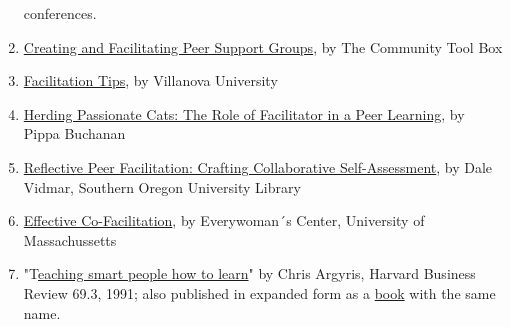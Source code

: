 \begin{enumerate}
  conferences.
\item
  \href{http://ctb.ku.edu/en/tablecontents/section\_1180.aspx}{Creating
  and Facilitating Peer Support Groups}, by The Community Tool Box
\item
  \href{http://www1.villanova.edu/content/villanova/artsci/vcle/resources/toolkit/\_jcr\_content/pagecontent/download\_8/file.res/FacilitationTips.doc}{Facilitation
  Tips}, by Villanova University
\item
  \href{http://pippabuchanan.com/2011/09/04/herding-passionate-cats-the-role-of-facilitator-in-a-peer-learning-process/}{Herding
  Passionate Cats: The Role of Facilitator in a Peer Learning}, by Pippa
  Buchanan
\item
  \href{http://webpages.sou.edu/~vidmar/SOARS2008/vidmar.ppt}{Reflective
  Peer Facilitation: Crafting Collaborative Self-Assessment}, by Dale
  Vidmar, Southern Oregon University Library
\item
  \href{http://www.umass.edu/ewc/ea/Facilitation\%20Skills/important\%20tips.doc}{Effective
  Co-Facilitation}, by Everywoman´s Center, University of Massachussetts
\item
  "T\href{www.ncsu.edu/park\_scholarships/pdf/chris\_argyris\_learning.pdf?}{eaching
  smart people how to learn}" by Chris Argyris, Harvard Business Review
  69.3, 1991; also published in expanded form as a
  \href{http://www.amazon.com/Teaching-People-Harvard-Business-Classics/dp/1422126005}{book}
  with the same name.
\end{enumerate}
